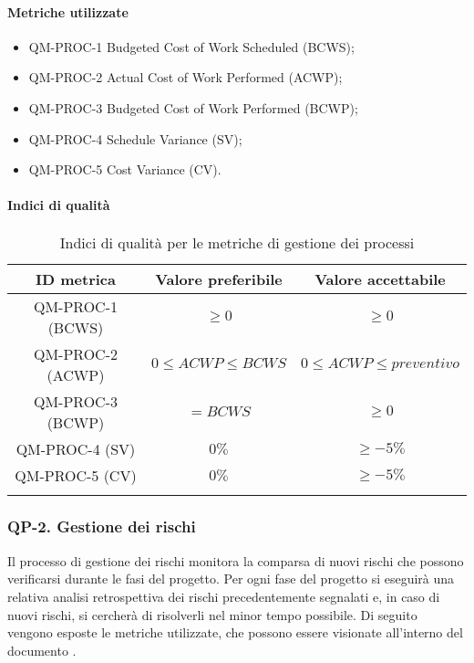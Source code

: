 		\paragraph{Metriche utilizzate}

			\begin{itemize}
				\item QM-PROC-1 Budgeted Cost of Work Scheduled (BCWS);
				\item QM-PROC-2 Actual Cost of Work Performed (ACWP);
				\item QM-PROC-3 Budgeted Cost of Work Performed (BCWP);
				\item QM-PROC-4 Schedule Variance (SV);
				\item QM-PROC-5 Cost Variance (CV).
			\end{itemize}

		\paragraph{Indici di qualità}

			\begin{center}
				\begin{longtable}{|c|c|c|}
				\hline
				\rowcolor{lighter-grayer}
				\textbf{ID metrica} & \textbf{Valore preferibile} & \textbf{Valore accettabile}\\
				\hline
				\endfirsthead
				\hline
				QM-PROC-1 (BCWS) & \(\ge 0\) & \(\ge 0\) \\
				\hline
				QM-PROC-2 (ACWP) & \(0 \le ACWP \le BCWS\) & \(0 \le ACWP \le preventivo\) \\
				\hline
				QM-PROC-3 (BCWP) & \(= BCWS\) & \(\ge 0\) \\
				\hline
				QM-PROC-4 (SV) & \(0\%\) & \(\ge -5\%\) \\
				\hline
				QM-PROC-5 (CV) & \(0\%\) & \(\ge -5\%\) \\
				\hline
				\caption{Indici di qualità per le metriche di gestione dei processi}
				\end{longtable}
			\end{center}

	\subsubsection{QP-2. Gestione dei rischi}

		Il processo di gestione dei rischi monitora la comparsa di nuovi rischi che possono verificarsi durante le fasi del progetto.
		\newline
		Per ogni fase del progetto si eseguirà una relativa analisi retrospettiva dei rischi precedentemente segnalati e, in caso di nuovi rischi, si cercherà di risolverli nel minor tempo possibile.
		\newline
		Di seguito vengono esposte le metriche utilizzate, che possono essere visionate all'interno del documento .

